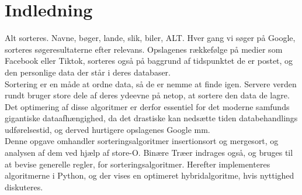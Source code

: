 \chapter*{Indledning}
\label{ch:Indledning}

Alt sorteres. Navne, bøger, lande, slik, biler, ALT. Hver gang vi søger på Google, sorteres søgeresultaterne efter relevans. Opslagenes rækkefølge på medier som Facebook eller Tiktok, sorteres også på baggrund af tidspunktet de er postet, og den personlige data der står i deres databaser.\\

Sortering er en måde at ordne data, så de er nemme at finde igen. Servere verden rundt bruger store dele af deres ydeevne på netop, at sortere den data de lagre. Det optimering af disse algoritmer er derfor essentiel for det moderne samfunds gigantiske dataafhængighed, da det drastiske kan nedsætte tiden databehandlings udførelsestid, og derved hurtigere opslagenes Google mm.\\

Denne opgave omhandler sorteringsalgoritmer insertionsort og mergesort, og analysen af dem ved hjælp af store-O. Binære Træer indrages også, og bruges til at bevise generelle regler, for sorteringsalgoritmer. Herefter implementeres algoritmerne i Python, og der vises en optimeret hybridalgoritme, hvis nyttighed diskuteres. 
